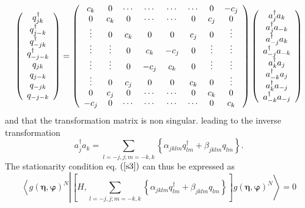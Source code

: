 \documentclass[aps,preprint]{revtex4}%
\begin{document}
\begin{equation}
\left(
\begin{array}
[c]{c}%
q_{jk}^{\dagger}\\
q_{j-k}^{\dagger}\\
q_{-jk}^{\dagger}\\
q_{-j-k}^{\dagger}\\
q_{jk}\\
q_{j-k}\\
q_{-jk}\\
q_{-j-k}%
\end{array}
\right)  =\left(
\begin{array}
[c]{cccccccc}%
c_{k} & 0 & \cdots & \cdots & \cdots & \cdots & 0 & -c_{j}\\
0 & c_{k} & 0 & \cdots & \cdots & 0 & c_{j} & 0\\
\vdots & 0 & c_{k} & 0 & 0 & c_{j} & 0 & \vdots\\
\vdots & \vdots & 0 & c_{k} & -c_{j} & 0 & \vdots & \vdots\\
\vdots & \vdots & 0 & -c_{j} & c_{k} & 0 & \vdots & \vdots\\
\vdots & 0 & c_{j} & 0 & 0 & c_{k} & 0 & \vdots\\
0 & c_{j} & 0 & \cdots & \cdots & 0 & c_{k} & 0\\
-c_{j} & 0 & \cdots & \cdots & \cdots & \cdots & 0 & c_{k}%
\end{array}
\right)  \left(
\begin{array}
[c]{c}%
a_{j}^{\dagger}a_{k}\\
a_{j}^{\dagger}a_{-k}\\
a_{-j}^{\dagger}a_{k}\\
a_{-j}^{\dagger}a_{-k}\\
a_{k}^{\dagger}a_{j}\\
a_{-k}^{\dagger}a_{j}\\
a_{k}^{\dagger}a_{-j}\\
a_{-k}^{\dagger}a_{-j}%
\end{array}
\right)
\end{equation}
and that the transformation matrix is non singular. leading to the inverse
transformation
\begin{equation}
a_{j}^{\dagger}a_{k}=\sum_{l=-j,j;m=-k,k}\left\{  \alpha_{jklm}q_{lm}%
^{\dagger}+\beta_{jklm}q_{lm}\right\}  .
\end{equation}
The stationarity condition eq. $\left(  \ref{s3}\right)  $ can thus be
expressed as
\begin{equation}
\left\langle g\left(  \mathbf{\eta},\mathbf{\varphi}\right)  ^{N}\right.
\left\vert \left[  H,\sum_{l=-j,j;m=-k,k}\left\{  \alpha_{jklm}q_{lm}%
^{\dagger}+\beta_{jklm}q_{lm}\right\}  \right]  g\left(  \mathbf{\eta
},\mathbf{\varphi}\right)  ^{N}\right\rangle =0
\end{equation}
%
\end{document}
